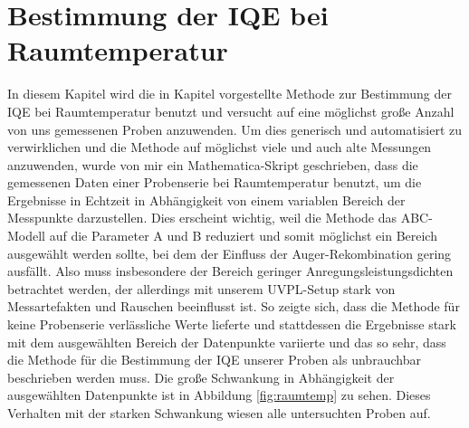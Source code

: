 \chapter{Bestimmung der IQE bei Raumtemperatur}
\thispagestyle{fancy}

In diesem Kapitel wird die in Kapitel vorgestellte Methode zur Bestimmung der IQE bei Raumtemperatur benutzt und versucht auf eine möglichst große Anzahl von uns gemessenen Proben anzuwenden. 
Um dies generisch und automatisiert zu verwirklichen und die Methode auf möglichst viele und auch alte Messungen anzuwenden, wurde von mir ein Mathematica-Skript geschrieben, dass die gemessenen Daten einer Probenserie bei Raumtemperatur benutzt, um die Ergebnisse in Echtzeit in Abhängigkeit von einem variablen Bereich der Messpunkte darzustellen. Dies erscheint wichtig, weil die Methode das ABC-Modell auf die Parameter A und B reduziert und somit möglichst ein Bereich ausgewählt werden sollte, bei dem der Einfluss der Auger-Rekombination gering ausfällt. Also muss insbesondere der Bereich geringer Anregungsleistungsdichten betrachtet werden, der allerdings mit unserem UVPL-Setup stark von Messartefakten und Rauschen beeinflusst ist. So zeigte sich, dass die Methode für keine Probenserie verlässliche Werte lieferte und stattdessen die Ergebnisse stark mit dem ausgewählten Bereich der Datenpunkte variierte und das so sehr, dass die Methode für die Bestimmung der IQE unserer Proben als unbrauchbar beschrieben werden muss. Die große Schwankung in Abhängigkeit der ausgewählten Datenpunkte ist in Abbildung \ref{fig:raumtemp} zu sehen. Dieses Verhalten mit der starken Schwankung wiesen alle untersuchten Proben auf. 
%
